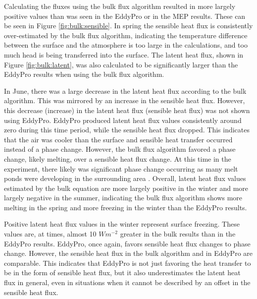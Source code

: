 Calculating the fluxes using the bulk flux algorithm resulted in more largely positive values than was seen in the EddyPro or in the MEP results. These can be seen in Figure \ref{fig:bulk:sensible}. In spring the sensible heat flux is consistently over-estimated by the bulk flux algorithm, indicating the temperature difference between the surface and the atmosphere is too large in the calculations, and too much head is being transferred into the surface. The latent heat flux, shown in Figure \ref{fig:bulk:latent}, was also calculated to be significantly larger than the EddyPro results when using the bulk flux algorithm. 

In June, there was a large decrease in the latent heat flux according to the bulk algorithm. This was mirrored by an increase in the sensible heat flux. However, this decrease (increase) in the latent heat flux (sensible heat flux) was not shown using EddyPro. EddyPro produced latent heat flux values consistently around zero during this time period, while the sensible heat flux dropped. This indicates that the air was cooler than the surface and sensible heat transfer occurred instead of a phase change. However, the bulk flux algorithm favored a phase change, likely melting, over a sensible heat flux change. At this time in the experiment, there likely was significant phase change occurring as many melt ponds were developing in the surrounding area \citep{walden:2017}. Overall, latent heat flux values estimated by the bulk equation are more largely positive in the winter and more largely negative in the summer, indicating the bulk flux algorithm shows more melting in the spring and more freezing in the winter than the EddyPro results. 

Positive latent heat flux values in the winter represent surface freezing. These values are, at times, almost 10 $Wm^{-2}$ greater in the bulk results than in the EddyPro results. EddyPro, once again, favors sensible heat flux changes to phase change. However, the sensible heat flux in the bulk algorithm and in EddyPro are comparable. This indicates that EddyPro is not just favoring the heat transfer to be in the form of sensible heat flux, but it also underestimates the latent heat flux in general, even in situations when it cannot be described by an offset in the sensible heat flux. 


